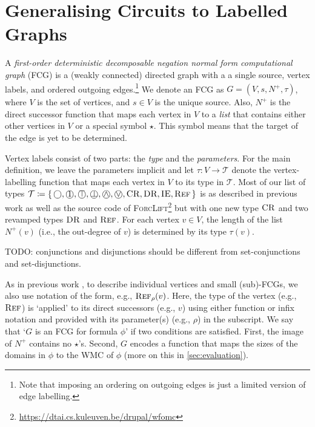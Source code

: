 \section{Generalising Circuits to Labelled Graphs}

A \emph{first-order deterministic decomposable negation normal form computational graph} (FCG) is a (weakly connected) directed graph with a a single source, vertex labels, and ordered outgoing edges.\footnote{Note that imposing an ordering on outgoing edges is just a limited version of edge labelling.} We denote an FCG as $G = (V, s, N^+, \tau)$, where $V$ is the set of vertices, and $s \in V$ is the unique source. Also, $N^+$ is the direct successor function that maps each vertex in $V$ to a \emph{list} that contains either other vertices in $V$ or a special symbol $\star$. This symbol means that the target of the edge is yet to be determined.

Vertex labels consist of two parts: the \emph{type} and the \emph{parameters}. For the main definition, we leave the parameters implicit and let $\tau\colon V \to \mathcal{T}$ denote the vertex-labelling function that maps each vertex in $V$ to its type in $\mathcal{T}$. Most of our list of types $\mathcal{T} \coloneqq \{\, \Smoothing, \Unit, \Tautology, \Contradiction, \oland, \olor, \CR, \DR, \IE, \Reff \,\}$ is as described in previous work \cite{DBLP:conf/nips/Broeck11,DBLP:conf/ijcai/BroeckTMDR11} as well as the source code of \textsc{ForcLift}\footnote{\url{https://dtai.cs.kuleuven.be/drupal/wfomc}} but with one new type $\operatorname{\textsc{CR}}$ and two revamped types $\operatorname{\textsc{DR}}$ and $\operatorname{\textsc{Ref}}$. For each vertex $v \in V$, the length of the list $N^+(v)$ (i.e., the out-degree of $v$) is determined by its type $\tau(v)$.

TODO: conjunctions and disjunctions should be different from set-conjunctions and set-disjunctions.

As in previous work \cite{DBLP:conf/ijcai/BroeckTMDR11}, to describe individual vertices and small (sub)-FCGs, we also use notation of the form, e.g., $\operatorname{\textsc{Ref}}_\rho(v)$. Here, the type of the vertex (e.g., $\operatorname{\textsc{Ref}}$) is `applied' to its direct successors (e.g., $v$) using either function or infix notation and provided with its parameter(s) (e.g., $\rho$) in the subscript. We say that `$G$ is an FCG for formula $\phi$' if two conditions are satisfied. First, the image of $N^+$ contains no $\star$'s. Second, $G$ encodes a function that maps the sizes of the domains in $\phi$ to the WMC of $\phi$ (more on this in \cref{sec:evaluation}).

